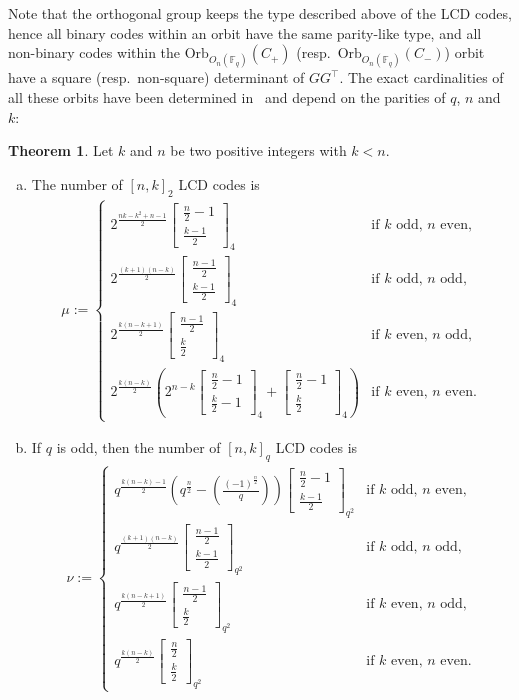 \documentclass[11pt]{article}
\theoremstyle{definition}
\newtheorem{theorem}{Theorem}[section]
\newcommand{\F}{\mathbb{F}}
\newcommand{\Leg}[2]{\left(\frac{#1}{#2}\right)}                       %
\newcommand{\Orb}{\mathrm{Orb}}
\newcommand{\Qbinom}[3]{{\begin{bmatrix} #1 \\ #2 \end{bmatrix}}_{#3}} %
\newcommand{\Ort}{O}
\begin{document}
Note that the orthogonal group keeps the type described above of the LCD codes, hence all binary codes within an orbit have the same parity-like type, and all non-binary codes within the $\Orb_{\Ort_n(\F_q)}(C_+)$ (resp.\ $\Orb_{\Ort_n(\F_q)}(C_-)$) orbit have a square (resp.\ non-square) determinant of $G G^\top$.
The exact cardinalities of all these orbits have been determined in~\cite{CMTQ18} and depend on the parities of $q$, $n$ and $k$:

\begin{theorem}\cite[Corollaries 17 and 32]{CMTQ18}
	Let $k$ and $n$ be two positive integers with $k < n$.
	\begin{enumerate}[(a)]
		\item The number of ${[n, k]}_2$ LCD codes is 
			\begin{align*}
				\mu:= \begin{cases}
					2^{\frac{nk-k^2+n-1}{2}} \Qbinom{\frac{n}{2}-1}{\frac{k-1}{2}}{4}
					& \text{if $k$ odd, $n$ even,} \\
					2^{\frac{(k+1)(n-k)}{2}} \Qbinom{\frac{n-1}{2}}{\frac{k-1}{2}}{4}
					& \text{if $k$ odd, $n$ odd,} \\
					2^{\frac{k(n-k+1)}{2}} \Qbinom{\frac{n-1}{2}}{\frac{k}{2}}{4}
					& \text{if $k$ even, $n$ odd,} \\
					2^{\frac{k(n-k)}{2}} \left( 2^{n-k} \Qbinom{\frac{n}{2}-1}{\frac{k}{2}-1}{4} + \Qbinom{\frac{n}{2}-1}{\frac{k}{2}}{4} \right)
					& \text{if $k$ even, $n$ even.}
				\end{cases}
			\end{align*}
		\item If $q$ is odd, then the number of ${[n, k]}_q$ LCD codes is 
			\begin{align*}
				\nu := \begin{cases}
					q^{\frac{k(n-k)-1}{2}} \left(q^{\frac{n}{2}} - \Leg{{(-1)}^{\frac{n}{2}}}{q} \right) \Qbinom{\frac{n}{2}-1}{\frac{k-1}{2}}{q^2}
					& \text{if $k$ odd, $n$ even,} \\
					q^{\frac{(k+1)(n-k)}{2}} \Qbinom{\frac{n-1}{2}}{\frac{k-1}{2}}{q^2}
					& \text{if $k$ odd, $n$ odd,} \\
					q^{\frac{k(n-k+1)}{2}} \Qbinom{\frac{n-1}{2}}{\frac{k}{2}}{q^2}
					& \text{if $k$ even, $n$ odd,} \\
					q^{\frac{k(n-k)}{2}} \Qbinom{\frac{n}{2}}{\frac{k}{2}}{q^2}
					& \text{if $k$ even, $n$ even.}
				\end{cases}
			\end{align*}
	\end{enumerate}
\end{theorem}
\end{document}
